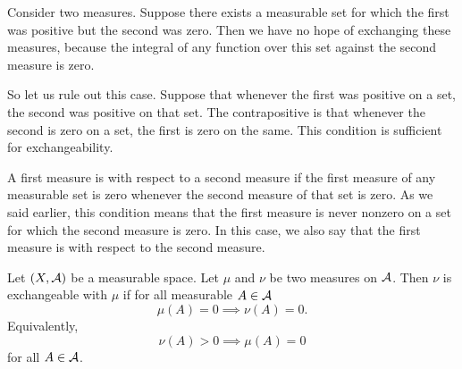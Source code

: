 Consider two measures.
Suppose there exists
a measurable set for which the first
was positive but the second was zero.
Then we have no hope of exchanging
these measures, because the integral
of any function over this set against
the second measure is zero.

So let us rule out this case.
Suppose that whenever the
first was positive on a set,
the second was positive on that set.
The contrapositive is that
whenever the second is zero
on a set, the first is zero on the same.
This condition
is sufficient for exchangeability.

A first measure is 
with respect to a second measure
if the first measure of any measurable
set is zero whenever the second measure
of that set is zero.
As we said earlier, this condition
means that the first measure
is never nonzero on a set for which
the second measure is zero.
In this case, we also say that
the first measure is
with respect to the second measure.


Let $(X, \mathcal{A})$ be a measurable space.
Let $\mu$ and $\nu$ be two measures
on $\mathcal{A}$.
Then $\nu$ is exchangeable with $\mu$
if for all measurable $A \in \mathcal{A}$
\[
  \mu(A) = 0 \implies \nu(A) = 0.
\]
Equivalently,
\[
  \nu(A) > 0 \implies \mu(A) = 0
\]
for all $A \in \mathcal{A}$.
\strats
